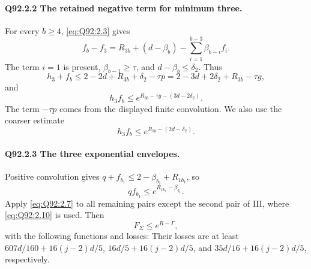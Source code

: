 \paragraph{Q92.2.2 The retained negative term for minimum three.}
For every \(b\ge\allowbreak 4\), \eqref{eq:Q92:2.3} gives
\begin{equation}\tag{Q92.2.8}\label{eq:Q92:2.8}
f_b-f_3=R_{3b}+(d-\beta_b)-\sum_{i=1}^{b-3}\beta_{b-i}f_i.
\end{equation}
The term \(i=\allowbreak 1\) is present, \(\beta_{b-1}\ge\allowbreak \tau\), and
\(d-\beta_b\le\allowbreak \delta_2\). Thus
\begin{equation}\tag{Q92.2.9}\label{eq:Q92:2.9}
h_3+f_b\le2-2d+R_{3b}+\delta_2-\tau p
=2-3d+2\delta_2+R_{3b}-\tau g,
\end{equation}
and
\begin{equation}\tag{Q92.2.10}\label{eq:Q92:2.10}
\boxed{h_3f_b\le e^{R_{3b}-\tau g-(3d-2\delta_2)}.}
\end{equation}
The term \(-\tau p\) comes from the displayed finite convolution.
We also use the coarser estimate
\begin{equation}\tag{Q92.2.11}\label{eq:Q92:2.11}
h_3f_b\le e^{R_{3b}-(2d-\delta_2)}.
\end{equation}

\paragraph{Q92.2.3 The three exponential envelopes.}
Positive convolution gives \(q+f_{b_1}\le\allowbreak 2-\beta_{b_1}+R_{1b_1}\), so
\begin{equation}\tag{Q92.2.12}\label{eq:Q92:2.12}
qf_{b_1}\le e^{R_{1b_1}-\beta_{b_1}}.
\end{equation}
Apply \eqref{eq:Q92:2.7} to all remaining pairs except the second pair
of III, where \eqref{eq:Q92:2.10} is used. Then
\begin{equation}\tag{Q92.2.13}\label{eq:Q92:2.13}
F_\Sigma\le e^{R-\Gamma},
\end{equation}
with the following functions and losses:
Their losses are at least \(607d/160+16(j-2)d/5\),
\(16d/5+16(j-2)d/5\), and \(35d/16+16(j-2)d/5\), respectively.

